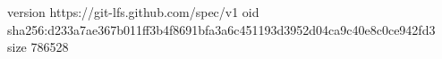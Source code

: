 version https://git-lfs.github.com/spec/v1
oid sha256:d233a7ae367b011ff3b4f8691bfa3a6c451193d3952d04ca9c40e8c0ce942fd3
size 786528
